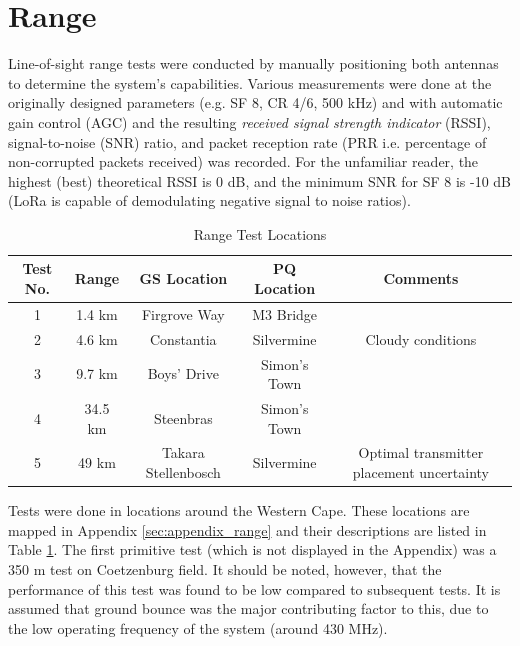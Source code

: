 \graphicspath{{./figures}}

\section{Range}

Line-of-sight range tests were conducted by manually positioning both antennas to determine the system's capabilities. Various measurements were done at the originally designed parameters (e.g. SF 8, CR 4/6, 500 kHz) and with automatic gain control (AGC) and the resulting \textit{received signal strength indicator} (RSSI), signal-to-noise (SNR) ratio, and packet reception rate (PRR i.e. percentage of non-corrupted packets received) was recorded. For the unfamiliar reader, the highest (best) theoretical RSSI is 0 dB, and the minimum SNR for SF 8 is -10 dB (LoRa is capable of demodulating negative signal to noise ratios).

\begin{table}[!htb]
  \centering
  \renewcommand{\arraystretch}{1.2}
  \hspace*{-1.5cm}
  \begin{tabular}{ |c|c|c|c|c| }
  \hline
  \textbf{Test No.}         & \textbf{Range}        & \textbf{GS Location}      & \textbf{PQ Location}      & \textbf{Comments} \\ 
  \hline
  1                         
  & 1.4 km  
  & Firgrove Way
  & M3 Bridge 
  & \\ \hline
  2
  & 4.6 km  
  & Constantia
  & Silvermine
  & Cloudy conditions \\ \hline
  3
  & 9.7 km  
  & Boys' Drive
  & Simon's Town
  & \\ \hline
  4
  & 34.5 km  
  & Steenbras
  & Simon's Town
  & \\ \hline
  5
  & 49 km  
  & Takara Stellenbosch  
  & Silvermine
  & Optimal transmitter placement uncertainty \\ \hline
  \end{tabular}
  \caption{Range Test Locations}
  \label{tab:rangeTestLocations}
\end{table}

Tests were done in locations around the Western Cape. These locations are mapped in Appendix \ref{sec:appendix_range} and their descriptions are listed in Table \ref{tab:rangeTestLocations}. The first primitive test (which is not displayed in the Appendix) was a 350 m test on Coetzenburg field. It should be noted, however, that the performance of this test was found to be low compared to subsequent tests. It is assumed that ground bounce was the major contributing factor to this, due to the low operating frequency of the system (around 430 MHz).

